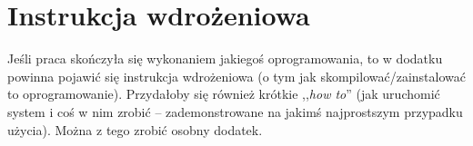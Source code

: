 \chapter{Instrukcja wdrożeniowa}
Jeśli praca skończyła się wykonaniem jakiegoś oprogramowania, to w dodatku powinna pojawić się instrukcja wdrożeniowa (o tym jak skompilować/zainstalować to oprogramowanie).
Przydałoby się również krótkie ,,\emph{how to}'' (jak uruchomić system i coś w nim zrobić -- zademonstrowane na jakimś najprostszym przypadku użycia). Można z tego zrobić osobny dodatek.